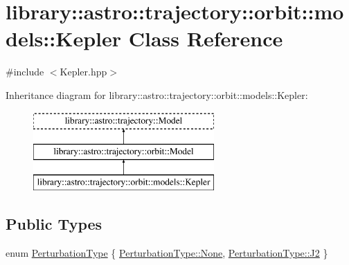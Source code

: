 \hypertarget{classlibrary_1_1astro_1_1trajectory_1_1orbit_1_1models_1_1_kepler}{}\section{library\+:\+:astro\+:\+:trajectory\+:\+:orbit\+:\+:models\+:\+:Kepler Class Reference}
\label{classlibrary_1_1astro_1_1trajectory_1_1orbit_1_1models_1_1_kepler}


{\ttfamily \#include $<$Kepler.\+hpp$>$}

Inheritance diagram for library\+:\+:astro\+:\+:trajectory\+:\+:orbit\+:\+:models\+:\+:Kepler\+:\begin{figure}[H]
\begin{center}
\leavevmode
\includegraphics[height=3.000000cm]{classlibrary_1_1astro_1_1trajectory_1_1orbit_1_1models_1_1_kepler}
\end{center}
\end{figure}
\subsection*{Public Types}
\begin{DoxyCompactItemize}
\item 
enum \hyperlink{classlibrary_1_1astro_1_1trajectory_1_1orbit_1_1models_1_1_kepler_a7f34995d6f287de65a6edb2d419a2fe0}{Perturbation\+Type} \{ \hyperlink{classlibrary_1_1astro_1_1trajectory_1_1orbit_1_1models_1_1_kepler_a7f34995d6f287de65a6edb2d419a2fe0a6adf97f83acf6453d4a6a4b1070f3754}{Perturbation\+Type\+::\+None}, 
\hyperlink{classlibrary_1_1astro_1_1trajectory_1_1orbit_1_1models_1_1_kepler_a7f34995d6f287de65a6edb2d419a2fe0a7f132d501fb9863844ab51697900d494}{Perturbation\+Type\+::\+J2}
 \}
\end{DoxyCompactItemize}
